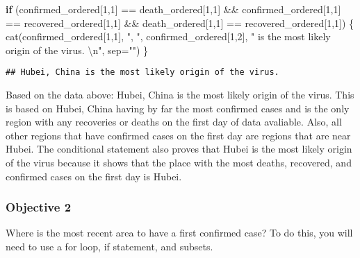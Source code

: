\documentclass[
]{article}
\newenvironment{Shaded}{\begin{snugshade}}{\end{snugshade}}
\newcommand{\AttributeTok}[1]{\textcolor[rgb]{0.77,0.63,0.00}{#1}}
\newcommand{\ControlFlowTok}[1]{\textcolor[rgb]{0.13,0.29,0.53}{\textbf{#1}}}
\newcommand{\DecValTok}[1]{\textcolor[rgb]{0.00,0.00,0.81}{#1}}
\newcommand{\FunctionTok}[1]{\textcolor[rgb]{0.00,0.00,0.00}{#1}}
\newcommand{\NormalTok}[1]{#1}
\newcommand{\SpecialCharTok}[1]{\textcolor[rgb]{0.00,0.00,0.00}{#1}}
\newcommand{\StringTok}[1]{\textcolor[rgb]{0.31,0.60,0.02}{#1}}
\begin{document}
\begin{Shaded}
\begin{Highlighting}[]
\ControlFlowTok{if}\NormalTok{ (confirmed\_ordered[}\DecValTok{1}\NormalTok{,}\DecValTok{1}\NormalTok{] }\SpecialCharTok{==}\NormalTok{ death\_ordered[}\DecValTok{1}\NormalTok{,}\DecValTok{1}\NormalTok{] }\SpecialCharTok{\&\&} 
\NormalTok{    confirmed\_ordered[}\DecValTok{1}\NormalTok{,}\DecValTok{1}\NormalTok{] }\SpecialCharTok{==}\NormalTok{ recovered\_ordered[}\DecValTok{1}\NormalTok{,}\DecValTok{1}\NormalTok{] }\SpecialCharTok{\&\&} 
\NormalTok{    death\_ordered[}\DecValTok{1}\NormalTok{,}\DecValTok{1}\NormalTok{] }\SpecialCharTok{==}\NormalTok{ recovered\_ordered[}\DecValTok{1}\NormalTok{,}\DecValTok{1}\NormalTok{])}
\NormalTok{\{}
  \FunctionTok{cat}\NormalTok{(confirmed\_ordered[}\DecValTok{1}\NormalTok{,}\DecValTok{1}\NormalTok{], }\StringTok{", "}\NormalTok{, confirmed\_ordered[}\DecValTok{1}\NormalTok{,}\DecValTok{2}\NormalTok{], }
    \StringTok{" is the most likely origin of the virus. }\SpecialCharTok{\textbackslash{}n}\StringTok{"}\NormalTok{, }\AttributeTok{sep=}\StringTok{""}\NormalTok{)}
\NormalTok{\}}
\end{Highlighting}
\end{Shaded}

\begin{verbatim}
## Hubei, China is the most likely origin of the virus.
\end{verbatim}

Based on the data above: Hubei, China is the most likely origin of the
virus. This is based on Hubei, China having by far the most confirmed
cases and is the only region with any recoveries or deaths on the first
day of data avaliable. Also, all other regions that have confirmed cases
on the first day are regions that are near Hubei. The conditional
statement also proves that Hubei is the most likely origin of the virus
because it shows that the place with the most deaths, recovered, and
confirmed cases on the first day is Hubei.

\hypertarget{objective-2}{%
\subsubsection{Objective 2}\label{objective-2}}

Where is the most recent area to have a first confirmed case? To do
this, you will need to use a for loop, if statement, and subsets.
\end{document}
